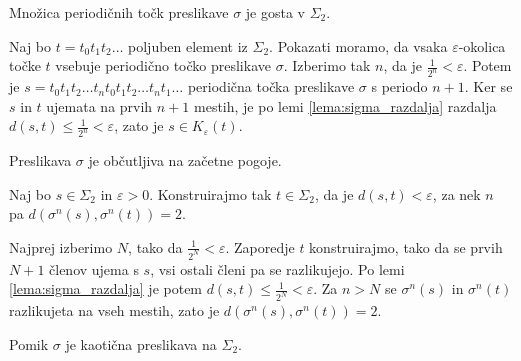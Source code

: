 \documentclass{isrmdelo}
\begin{document}
\begin{trditev}
\label{trditev:sigma_goste_periodicne}
Množica periodičnih točk preslikave $\sigma$ je gosta v $\Sigma_2$.
\end{trditev}


\begin{dokaz}
Naj bo $t = t_0 t_1 t_2 \dots$ poljuben element iz $\Sigma_2$. Pokazati moramo, da vsaka $\varepsilon$-okolica točke $t$ vsebuje periodično točko preslikave $\sigma$. Izberimo tak $n$, da je $\frac{1}{2^n} < \varepsilon$. Potem je $s = t_0 t_1 t_2 \dots t_n t_0 t_1 t_2 \dots t_n t_1 \dots$ periodična točka preslikave $\sigma$ s periodo $n+1$. Ker se $s$ in $t$ ujemata na prvih $n+1$ mestih, je po lemi \ref{lema:sigma_razdalja} razdalja $d(s,t) \leq \frac{1}{2^n} < \varepsilon$, zato je $s \in K_\varepsilon(t)$. \qedhere
\end{dokaz}


\begin{trditev}
\label{trditev:sigma_zacetni_pogoji}
Preslikava $\sigma$ je občutljiva na začetne pogoje.
\end{trditev}

\begin{dokaz}
Naj bo $s \in \Sigma_2$ in $\varepsilon > 0$. Konstruirajmo tak $t \in \Sigma_2$, da je $d(s,t) < \varepsilon$, za nek $n$ pa $d(\sigma^n(s), \sigma^n(t)) = 2$.

Najprej izberimo $N$, tako da $\frac{1}{2^N} < \varepsilon$. Zaporedje $t$ konstruirajmo, tako da se prvih $N+1$ členov ujema s $s$, vsi ostali členi pa se razlikujejo. Po lemi \ref{lema:sigma_razdalja} je potem $d(s,t) \leq \frac{1}{2^N} < \varepsilon$. Za $n > N$ se $\sigma^n(s)$ in $\sigma^n(t)$ razlikujeta na vseh mestih, zato je $d(\sigma^n(s), \sigma^n(t)) = 2$. \qedhere
\end{dokaz}

\medskip

\begin{izrek}
Pomik $\sigma$ je kaotična preslikava na $\Sigma_2$.
\end{izrek}
\end{document}
